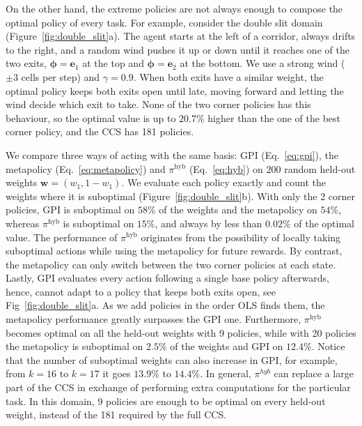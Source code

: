 \documentclass[11pt]{article}
\newcommand{\vphi}{\bm{\phi}}      %
\begin{document}
On the other hand, the extreme policies are not always enough to compose the optimal policy of every task. For example, consider the double slit domain~\cite{kuric_planning_2024} (Figure~\ref{fig:double_slit}a). The agent starts at the left of a corridor, always drifts to the right, and a random wind pushes it up or down until it reaches one of the two exits, $\vphi = \mathbf{e}_1$ at the top and $\vphi = \mathbf{e}_2$ at the bottom. We use a strong wind ($\pm 3$ cells per step) and $\gamma = 0.9$. When both exits have a similar weight, the optimal policy keeps both exits open until late, moving forward and letting the wind decide which exit to take. None of the two corner policies has this behaviour, so the optimal value is up to $20.7\%$ higher than the one of the best corner policy, and the CCS has 181 policies.

We compare three ways of acting with the same basis: GPI (Eq.~\eqref{eq:gpi}), the metapolicy (Eq.~\eqref{eq:metapolicy}) and $\pi^{\mathrm{hyb}}$ (Eq.~\eqref{eq:hyb}) on $200$ random held-out weights $\mathbf{w} = (w_1, 1 - w_1)$. We evaluate each policy exactly and count the weights where it is suboptimal (Figure~\ref{fig:double_slit}b). With only the 2 corner policies, GPI is suboptimal on $58\%$ of the weights and the metapolicy on $54\%$, whereas $\pi^{\mathrm{hyb}}$ is suboptimal on $15\%$, and always by less than $0.02\%$ of the optimal value. The performance of $\pi^{\mathrm{hyb}}$ originates from the possibility of locally taking suboptimal actions while using the metapolicy for future rewards. By contrast, the metapolicy can only switch between the two corner policies at each state. Lastly, GPI evaluates every action following a single base policy afterwards, hence, cannot adapt to a policy that keeps both exits open, see Fig~\ref{fig:double_slit}a. As we add policies in the order OLS finds them, the metapolicy performance greatly surpasses the GPI one. Furthermore, $\pi^{\mathrm{hyb}}$ becomes optimal on all the held-out weights with 9 policies, while with 20 policies the metapolicy is suboptimal on $2.5\%$ of the weights and GPI on $12.4\%$. Notice that the number of suboptimal weights can also increase in GPI, for example, from $k=16$ to $k=17$ it goes $13.9\%$ to $14.4\%$. In general, $\pi^{hyb}$ can replace a large part of the CCS in exchange of performing extra computations for the particular task. In this domain, 9 policies are enough to be optimal on every held-out weight, instead of the 181 required by the full CCS.
\end{document}
